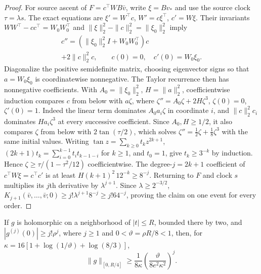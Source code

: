 \begin{proof}
For source ascent of \(F=c^\top WB\bar v\), write \(\xi=Bv_*\) and use
the source clock \(\tau=\lambda s\). The exact equations are
\(\xi'=W^\top c\), \(W'=c\xi^\top\), \(c'=W\xi\). Their invariants
\(WW^\top-cc^\top=W_0W_0^\top\) and
\(\|\xi\|_2^2-\|c\|_2^2=\|\xi_0\|_2^2\) imply
\begin{equation}\label{cp:nth:eq:source-ascent}{\begin{gathered}
c''=(\|\xi_0\|_2^2I+W_0W_0^\top)c\\+2\|c\|_2^2c,\qquad
c(0)=0,\quad c'(0)=W_0\xi_0.
\end{gathered}}\end{equation} Diagonalize the positive semidefinite
matrix, choosing eigenvector signs so that \(a=W_0\xi_0\) is
coordinatewise nonnegative. The Taylor recurrence then has nonnegative
coefficients. With \(A_0=\|\xi_0\|_2^2\), \(H=\|a\|_2^2\),
coefficientwise induction compares \(c\) from below with \(a \zeta\), where
\(\zeta''=A_0\zeta+2H\zeta^3\), \(\zeta(0)=0\), \(\zeta'(0)=1\). Indeed the linear term
dominates \(A_0a_i \zeta\) in coordinate \(i\), and \(\|c\|_2^2c_i\)
dominates \(H a_i \zeta^3\) at every successive coefficient. Since
\(A_0,H\ge1/2\), it also compares \(\zeta\) from below with
\(2\tan(\tau/2)\), which solves \(\zeta''=\frac12\zeta+\frac18\zeta^3\) with the
same initial values. Writing \(\tan z=\sum_{k\ge0}t_kz^{2k+1}\),
\((2k+1)t_k=\sum_{i=0}^{k-1}t_it_{k-1-i}\) for
\(k\ge1\), and \(t_0=1\), give \(t_k\ge3^{-k}\) by induction. Hence
\(\zeta\ge\tau/(1-\tau^2/12)\) coefficientwise. The degree-\(j=2k+1\)
coefficient of \(c^\top W\xi=c^\top c'\) is at least
\(H(k+1)^2\,12^{-k}\ge8^{-j}\). Returning to \(F\) and clock \(s\)
multiplies its \(j\)th derivative by \(\lambda^{j+1}\). Since
\(\lambda\ge2^{-3/2}\),
\(K_{j+1}(\bar v,\ldots,\bar v;0)\ge j!\lambda^{j+1}8^{-j}
\ge j!64^{-j}\), proving the claim on one event for every order.
\end{proof}

\begin{lemma}\label{cp:nth:analytic-transfer}

If \(g\) is holomorphic on a neighborhood of \(|t|\le R\), bounded there
by two, and \(|g^{(j)}(0)|\ge j!\rho^j\), where \(j\ge1\) and
\(0<\vartheta=\rho R/8<1\), then, for
\(\kappa=16[1+\log(1/\vartheta)+\log(8/3)]\),
\begin{equation}\label{cp:nth:eq:transfer}{
\|g\|_{[0,R/4]}\ge
\frac1{8\kappa}\left(\frac{\vartheta}{8e^2\kappa^2}\right)^j.
}\end{equation}

\end{lemma}

